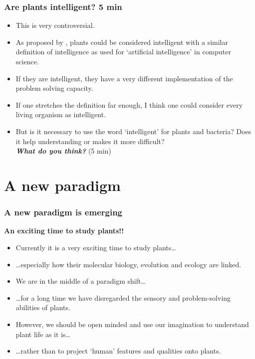 \documentclass[10pt]{beamer}
\newcommand\webglyphs[1]{{\webglyphsfont\symbol{#1}}}
\newcommand\Discussion{\colorbox{white}{\textcolor{black}{\webglyphs{"F134}}}\xspace}
\begin{document}
\begin{frame}
\frametitle{Are plants intelligent? \Discussion 5 min}
    \begin{itemize}
        \item This is very controversial.
        \item As proposed by  \autocite{Trewavas2014}, plants could be considered intelligent with a similar definition of intelligence as used for `artificial intelligence' in computer science.
        \item If they are intelligent, they have a very different implementation of the problem solving capacity.
        \item If one stretches the definition far enough, I think one could consider every living organism as intelligent.
        \item But is it necessary to use the word `intelligent' for plants and bacteria? Does it help understanding or makes it more difficult?\\[1ex]
        \emph{\textbf{What do you think?}} (5 min)
    \end{itemize}
\end{frame}

\section{A new paradigm}

\begin{frame}
\frametitle{A new paradigm is emerging}
\textbf{An exciting time to study plants!!}
    \begin{itemize}
      \item Currently it is a very exciting time to study plants\ldots
      \item \ldots especially how their molecular biology, evolution and ecology are linked.
      \item We are in the middle of a paradigm shift\ldots
      \item \ldots for a long time we have disregarded the sensory and problem-solving abilities of plants.
      \item However, we should be open minded and use our imagination to understand plant life as it is\ldots
      \item \ldots rather than to project `human' features and qualities onto plants.
    \end{itemize}
\end{frame}
\end{document}
